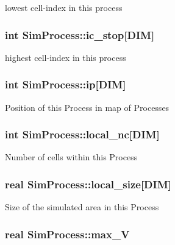 lowest cell-\/index in this process \hypertarget{class_sim_process_a4cdde257ea292d400576dbd8e36f8cde}{
\subsubsection[{ic\-\_\-stop}]{\setlength{\rightskip}{0pt plus 5cm}int Sim\-Process\-::ic\-\_\-stop\mbox{[}D\-I\-M\mbox{]}}}\label{class_sim_process_a4cdde257ea292d400576dbd8e36f8cde}
highest cell-\/index in this process \hypertarget{class_sim_process_a258e3fa7cfc226d61d940de1599dfa2a}{
\subsubsection[{ip}]{\setlength{\rightskip}{0pt plus 5cm}int Sim\-Process\-::ip\mbox{[}D\-I\-M\mbox{]}}}\label{class_sim_process_a258e3fa7cfc226d61d940de1599dfa2a}
Position of this Process in map of Processes \hypertarget{class_sim_process_a289a9950d641f552152ed2c124978839}{
\subsubsection[{local\-\_\-nc}]{\setlength{\rightskip}{0pt plus 5cm}int Sim\-Process\-::local\-\_\-nc\mbox{[}D\-I\-M\mbox{]}}}\label{class_sim_process_a289a9950d641f552152ed2c124978839}
Number of cells within this Process \hypertarget{class_sim_process_a4694d23dff9f83ae985f8dfbfa2939cb}{
\subsubsection[{local\-\_\-size}]{\setlength{\rightskip}{0pt plus 5cm}real Sim\-Process\-::local\-\_\-size\mbox{[}D\-I\-M\mbox{]}}}\label{class_sim_process_a4694d23dff9f83ae985f8dfbfa2939cb}
Size of the simulated area in this Process \hypertarget{class_sim_process_a7f1db440fa09d4e6826a552602724e76}{
\subsubsection[{max\-\_\-\-V}]{\setlength{\rightskip}{0pt plus 5cm}real Sim\-Process\-::max\-\_\-\-V}}\label{class_sim_process_a7f1db440fa09d4e6826a552602724e76}
